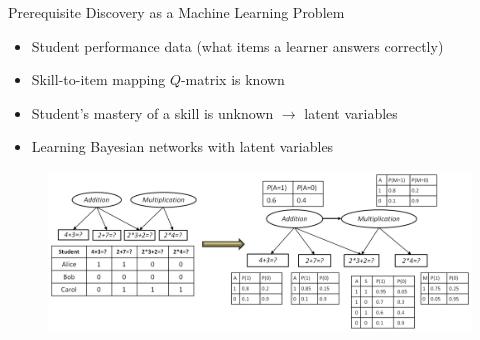 \documentclass[hyperref={pdfpagelabels=false}]{beamer}
\begin{document}
\begin{frame}{Prerequisite Discovery as a Machine Learning Problem}
		\begin{itemize}\small
			\item Student performance data (what items a learner answers correctly)
			\item Skill-to-item mapping $Q$-matrix is known
			\item Student's mastery of a skill is unknown $\rightarrow$ latent variables
			\item Learning Bayesian networks with latent variables 
		\end{itemize}

	\begin{figure}[h]
		\begin{center}
			\includegraphics[scale = .4]{figures/prereqdiscovery.png}
		\end{center}
	\end{figure}
\end{frame}
\end{document}
